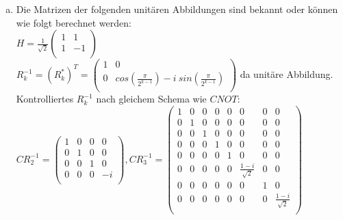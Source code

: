 \documentclass[a4paper]{scrartcl}
\begin{document}
\begin{enumerate}[a)]
\item Die Matrizen der folgenden unitären Abbildungen sind bekannt oder können wie folgt berechnet werden:\\
$H=\frac{1}{\sqrt{2}}\begin{pmatrix} 1 & 1\\ 1 & -1\\\end{pmatrix}$\\
$R_k^{-1}=(R_k^{*})^T=\begin{pmatrix} 1 & 0\\ 0 & cos(\frac{\pi}{2^{k-1}})-i~sin(\frac{\pi}{2^{k-1}})\\\end{pmatrix}$ da unitäre Abbildung.\\
Kontrolliertes $R_k^{-1}$ nach gleichem Schema wie $CNOT$:\\
$CR_2^{-1}=
\begin{pmatrix} 1 & 0 & 0 & 0\\
0 & 1 & 0 & 0\\
0 & 0 & 1 & 0\\
0 & 0 & 0 & -i\\\end{pmatrix}, CR_3^{-1}=
\begin{pmatrix}
1 & 0 & 0 & 0 & 0 & 0 & 0 & 0\\
0 & 1 & 0 & 0 & 0 & 0 & 0 & 0\\
0 & 0 & 1 & 0 & 0 & 0 & 0 & 0\\
0 & 0 & 0 & 1 & 0 & 0 & 0 & 0\\
0 & 0 & 0 & 0 & 1 & 0 & 0 & 0\\
0 & 0 & 0 & 0 & 0 & \frac{1-i}{\sqrt{2}} & 0 & 0\\
0 & 0 & 0 & 0 & 0 & 0 & 1 & 0\\
0 & 0 & 0 & 0 & 0 & 0 & 0 & \frac{1-i}{\sqrt{2}}\\\end{pmatrix}$\\


\end{enumerate}
\end{document}
